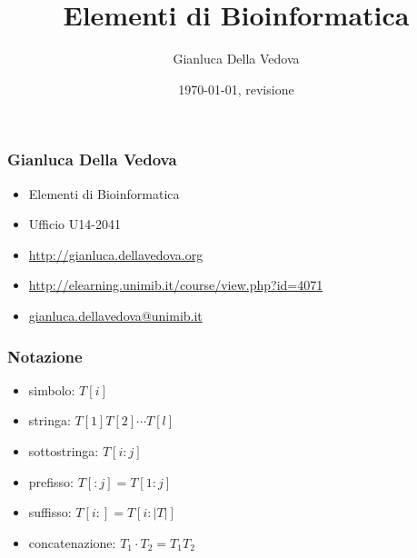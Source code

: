 \usepackage[italian]{babel}
\usepackage[utf8]{inputenc}
\usepackage{pgf}
\usepackage{verbatim}
\usepackage{inconsolata}
\usepackage{listings}


\usepackage{url}
\usepackage{xmpmulti}
\usepackage[T1]{fontenc}
\immediate{}


\author{Gianluca Della Vedova}
\title{Elementi di Bioinformatica}
\date{\today, {\tiny revisione \VCRevision}}



\beamerdefaultoverlayspecification{<+->}

\graphicspath{{figures/}}



\begin{frame}
  \titlepage
\end{frame}


\begin{frame}\frametitle{Gianluca Della Vedova}
\begin{itemize}
\item
Elementi di Bioinformatica
\item
Ufficio U14-2041
\item
\url{http://gianluca.dellavedova.org}
\item
\url{http://elearning.unimib.it/course/view.php?id=4071}
\item
\url{gianluca.dellavedova@unimib.it}
\end{itemize}
\end{frame}

\begin{frame}[fragile]
\frametitle{Notazione}
\begin{itemize}
\item
\alert{simbolo}: $T[i]$\\
\item
\alert{stringa}: $T[1]T[2]\cdots T[l]$\\
\item
\alert{sottostringa}: $T[i:j]$\\
\item
\alert{prefisso}: $T[:j]=T[1:j]$\\
\item
\alert{suffisso}: $T[i:]=T[i:|T|]$
\item
\alert{concatenazione}: $T_{1}\cdot T_{2} = T_{1}T_{2}$
\end{itemize}
\end{frame}


